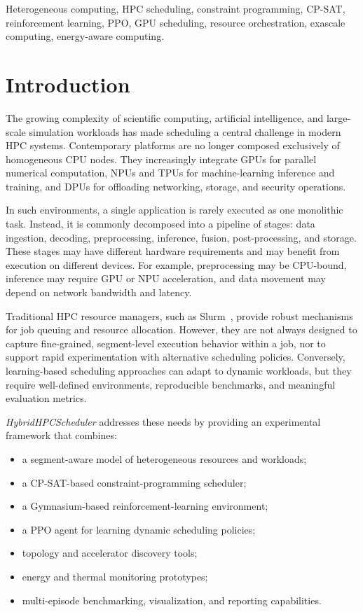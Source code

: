 \documentclass[conference]{IEEEtran}
\begin{document}
\begin{IEEEkeywords}
Heterogeneous computing, HPC scheduling, constraint programming, CP-SAT,
reinforcement learning, PPO, GPU scheduling, resource orchestration,
exascale computing, energy-aware computing.
\end{IEEEkeywords}

\section{Introduction}
The growing complexity of scientific computing, artificial intelligence, and
large-scale simulation workloads has made scheduling a central challenge in
modern HPC systems. Contemporary platforms are no longer composed exclusively
of homogeneous CPU nodes. They increasingly integrate GPUs for parallel
numerical computation, NPUs and TPUs for machine-learning inference and
training, and DPUs for offloading networking, storage, and security operations.

In such environments, a single application is rarely executed as one monolithic
task. Instead, it is commonly decomposed into a pipeline of stages: data
ingestion, decoding, preprocessing, inference, fusion, post-processing, and
storage. These stages may have different hardware requirements and may benefit
from execution on different devices. For example, preprocessing may be
CPU-bound, inference may require GPU or NPU acceleration, and data movement may
depend on network bandwidth and latency.

Traditional HPC resource managers, such as Slurm~\cite{slurm}, provide robust
mechanisms for job queuing and resource allocation. However, they are not
always designed to capture fine-grained, segment-level execution behavior
within a job, nor to support rapid experimentation with alternative scheduling
policies. Conversely, learning-based scheduling approaches can adapt to dynamic
workloads, but they require well-defined environments, reproducible benchmarks,
and meaningful evaluation metrics.

\textit{HybridHPCScheduler} addresses these needs by providing an experimental
framework that combines:
\begin{itemize}
    \item a segment-aware model of heterogeneous resources and workloads;
    \item a CP-SAT-based constraint-programming scheduler;
    \item a Gymnasium-based reinforcement-learning environment;
    \item a PPO agent for learning dynamic scheduling policies;
    \item topology and accelerator discovery tools;
    \item energy and thermal monitoring prototypes;
    \item multi-episode benchmarking, visualization, and reporting capabilities.
\end{itemize}
\end{document}
